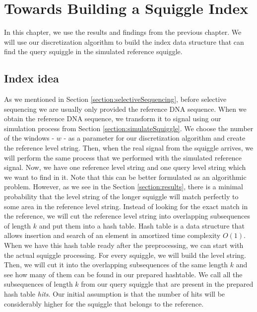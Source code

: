 \chapter{Towards Building a Squiggle Index}

\label{kap:methAdjust}

In this chapter, we use the results and findings from the previous chapter. We will
use our discretization algorithm to build the index data structure that can
find the query squiggle in the simulated reference squiggle.

\section{Index idea}
\label{section:indexIdea}

As we mentioned in Section \ref{section:selectiveSequencing}, before selective sequencing
we are usually only provided the reference DNA sequence.
When we obtain the reference DNA sequence, we transform it to signal using our simulation
process from Section \ref{section:simulateSquiggle}. We choose the number of the windows - $w$ -
as a parameter for our discretization algorithm and create the reference level string.
Then, when the real signal from the squiggle arrives, we will perform the same process
that we performed with the simulated reference signal. Now, we have one reference level string and
one query level string which we want to find in it. Note that this can be better formulated as an
algorithmic problem. However, as we see in the Section \ref{section:results}, there is a minimal probability that the level string
of the longer squiggle will match perfectly to some area in the reference level string.
Instead of looking for the exact match in the reference, we will cut the reference
level string into overlapping subsequences of length $k$ and put them into a hash table.
Hash table is a data structure that allows insertion and search of an element in
amortized time complexity $O(1)$. When we have this hash table ready after the
preprocessing, we can start with the actual squiggle processing. For every squiggle, we will
build the level string. Then, we will cut it into the overlapping
subsequences of the same length $k$ and see how many of them can be found in our
prepared hashtable. We call all the subsequences of length $k$ from our query squiggle that are
present in the prepared hash table \textit{hits}. Our initial assumption is that the number
of hits will be considerably higher for the squiggle that belongs to the reference.

